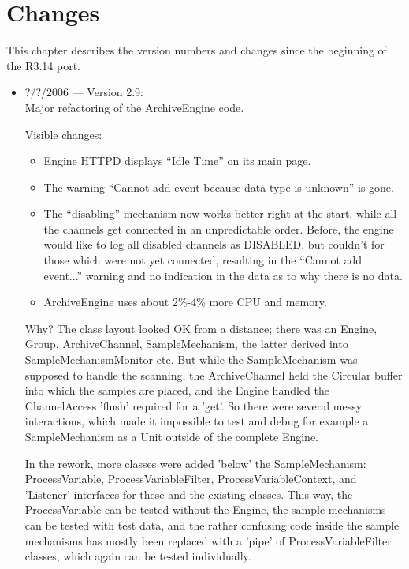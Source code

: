 \chapter{Changes}

This chapter describes the version numbers and changes since
the beginning of the R3.14 port.

\begin{itemize}

\item ?/?/2006 --- Version 2.9:\\
Major refactoring of the ArchiveEngine code.

Visible changes:
\begin{itemize}
\item Engine HTTPD displays ``Idle Time'' on its main page.
\item The warning ``Cannot add event because data type is unknown'' is gone.
\item The ``disabling'' mechanism now works better right at the start,
      while all the channels get connected in an unpredictable order.
      Before, the engine would like to log all disabled channels as DISABLED,
      but couldn't for those which were not yet connected,
      resulting in the ``Cannot add event...'' warning and no indication
      in the data as to why there is no data.
\item ArchiveEngine uses about 2\%-4\% more CPU and memory.
\end{itemize}

Why? The class layout looked OK from a distance;
there was an Engine, Group, ArchiveChannel, SampleMechanism,
the latter derived into SampleMechanismMonitor etc.
But while the SampleMechanism was supposed to handle
the scanning, the ArchiveChannel held the Circular buffer
into which the samples are placed,
and the Engine handled the ChannelAccess 'flush' required
for a 'get'. So there were several messy interactions,
which made it impossible to test and debug for example a SampleMechanism
as a Unit outside of the complete Engine.

In the rework, more classes were added 'below' the SampleMechanism:
ProcessVariable, ProcessVariableFilter, ProcessVariableContext,
and 'Listener' interfaces for these and the existing classes.
This way, the ProcessVariable can be tested without the Engine,
the sample mechanisms can be tested with test data,
and the rather confusing code inside the sample mechanisms
has mostly been replaced with a 'pipe' of ProcessVariableFilter
classes, which again can be tested individually.


\end{itemize}
